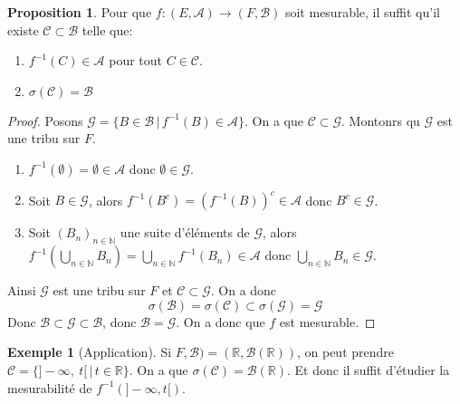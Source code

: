 \documentclass{article}
\theoremstyle{definition}
\theoremstyle{definition}
\newtheorem{prop}{Proposition}
\theoremstyle{definition}
\theoremstyle{definition}
\newtheorem{example}{Exemple}
\theoremstyle{plain}
\theoremstyle{definition}
\begin{document}
\begin{prop}
	Pour que $f : (E, \mathscr{A}) \to (F, \mathscr{B})$ soit mesurable, il suffit qu'il existe $\mathscr{C} \subset \mathscr{B}$ telle que:
	\begin{enumerate}
		\item $f^{-1}(C) \in \mathscr{A}$ pour tout $C \in \mathscr{C}$.
		\item $\sigma(\mathscr{C}) = \mathscr{B}$
	\end{enumerate}
\end{prop}

\begin{proof}
	Posons $\mathscr{G} = \{ B \in \mathscr{B} \, | \, f^{-1}(B) \in \mathscr{A} \}$. On a que $\mathscr{C} \subset \mathscr{G}$.
	Montonrs qu $\mathscr{G}$ est une tribu sur $F$.
	\begin{enumerate}
		\item $f^{-1}(\emptyset) = \emptyset \in \mathscr{A}$ donc $\emptyset \in \mathscr{G}$.
		\item Soit $B \in \mathscr{G}$, alors $f^{-1}(B^c) = (f^{-1}(B))^c \in \mathscr{A}$ donc $B^c \in \mathscr{G}$.
		\item Soit $(B_n)_{n \in \mathbb{N}}$ une suite d'éléments de $\mathscr{G}$, alors
		      $f^{-1}(\bigcup\limits_{n \in \mathbb{N}} B_n) = \bigcup\limits_{n \in \mathbb{N}} f^{-1}(B_n) \in \mathscr{A}$ donc
		      $\bigcup\limits_{n \in \mathbb{N}} B_n \in \mathscr{G}$.
	\end{enumerate}
	Ainsi $\mathscr{G}$ est une tribu sur $F$ et $\mathscr{C} \subset \mathscr{G}$.
	On a donc
	\[ \sigma(\mathscr{B}) = \sigma(\mathscr{C}) \subset \sigma(\mathscr{G}) = \mathscr{G} \]
	Donc $\mathscr{B} \subset \mathscr{G} \subset \mathscr{B}$, donc $\mathscr{B} = \mathscr{G}$.
	On a donc que $f$ est mesurable.
\end{proof}


\begin{example}[Application]
	Si $F, \mathscr{B}) = (\mathbb{R}, \mathscr{B}(\mathbb{R}))$, on peut prendre $\mathscr{C} = \{ ]-\infty,\   t[ \, | \, t \in \mathbb{R} \}$. On a que
				$\sigma(\mathscr{C}) = \mathscr{B}(\mathbb{R})$. Et donc il suffit d'étudier la mesurabilité de $f^{-1}(]-\infty, t[)$.
\end{example}
\end{document}
